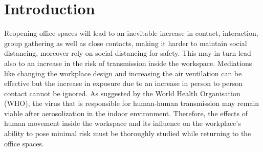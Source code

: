 \documentclass[acmtog]{acmart}
\begin{document}
\section{Introduction}
Reopening office spaces will lead to an inevitable increase in contact, interaction, group gathering as well as close contacts, making it harder to maintain social distancing, moreover rely on social distancing for safety. This may in turn lead also to an increase in the risk of transmission inside the workspace. Mediations like changing the workplace design and increasing the air ventilation can be effective but the increase in exposure due to an increase in person to person contact cannot be ignored. As suggested by the World Health Organisation (WHO), the virus that is responsible for human-human transmission may remain viable after aerosolization in the indoor environment. Therefore, the effects of human movement inside the workspace and its influence on the workplace's ability to pose minimal risk must be thoroughly studied while returning to the office spaces. 
\end{document}
